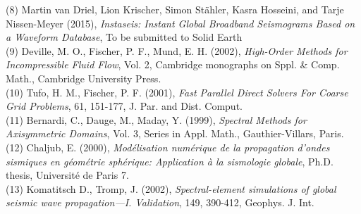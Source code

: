 \documentclass{article}
\begin{document}
(8) Martin van Driel, Lion Krischer, Simon Stähler, Kasra Hosseini, and Tarje Nissen-Meyer (2015),
\textit{Instaseis: Instant Global Broadband Seismograms Based on a Waveform Database},
To be submitted to Solid Earth\\

(9) Deville, M. O., Fischer, P. F., Mund, E. H. (2002),
\textit{High-Order Methods for Incompressible Fluid Flow},
Vol. 2, Cambridge monographs on Sppl. \& Comp. Math., Cambridge University Press.\\

(10) Tufo, H. M., Fischer, P. F. (2001), \textit{Fast Parallel Direct Solvers For Coarse
Grid Problems}, 61, 151-177, J. Par. and Dist. Comput.\\

(11) Bernardi, C., Dauge, M., Maday, Y. (1999), \textit{Spectral Methods for Axisymmetric
Domains}, Vol. 3, Series in Appl. Math., Gauthier-Villars, Paris.\\

(12) Chaljub, E. (2000), \textit{Mod{\'{e}}lisation num{\'{e}}rique de la
propagation d'ondes sismiques en g{\'{e}}om{\'{e}}trie sph{\'{e}}rique:
Application {\`{a}} la sismologie globale},
Ph.D. thesis, Universit{\'{e}} de Paris 7.\\

(13) Komatitsch D., Tromp, J. (2002), \textit{Spectral-element simulations of
global seismic wave propagation---I. Validation},
149, 390-412, Geophys. J. Int.
\end{document}
